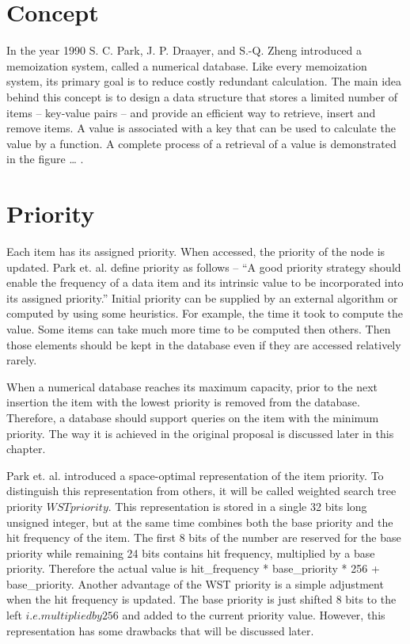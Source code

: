 

\section{Concept}
In the year 1990 S. C. Park, J. P. Draayer, and S.-Q. Zheng introduced a memoization system, called a numerical database. Like every memoization system, its primary goal is to reduce costly redundant calculation. The main idea behind this concept is to design a data structure that stores a limited number of items – key-value pairs – and provide an efficient way to retrieve, insert and remove items. A value is associated with a key that can be used to calculate the value by a function. A complete process of a retrieval of a value is demonstrated in the figure … .

\section{Priority}

Each item has its assigned priority. When accessed, the priority of the node is updated. Park et. al. define priority as follows – “A good priority strategy should enable the frequency of a data item and its intrinsic value to be incorporated into its assigned priority.” Initial priority can be supplied by an external algorithm or computed by using some heuristics. For example, the time it took to compute the value. Some items can take much more time to be computed then others. Then those elements should be kept in the database even if they are accessed relatively rarely.

When a numerical database reaches its maximum capacity, prior to the next insertion the item with the lowest priority is removed from the database. Therefore, a database should support queries on the item with the minimum priority. The way it is achieved in the original proposal is discussed later in this chapter.

Park et. al. introduced a space-optimal representation of the item priority. To distinguish this representation from others, it will be called weighted search tree priority \(WST priority\). This representation is stored in a single 32 bits long unsigned integer, but at the same time combines both the base priority and the hit frequency of the item. The first 8 bits of the number are reserved for the base priority while remaining 24 bits contains hit frequency, multiplied by a base priority.
Therefore the actual value is hit\_frequency * base\_priority * 256 + base\_priority. Another advantage of the WST priority is a simple adjustment when the hit frequency is updated. The base priority is just shifted 8 bits to the left \(i.e. multiplied by 256\) and added to the current priority value. However, this representation has some drawbacks that will be discussed later.

